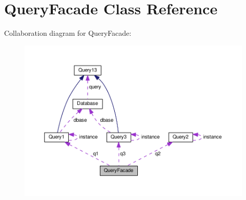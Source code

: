 \hypertarget{classQueryFacade}{}\section{Query\+Facade Class Reference}
\label{classQueryFacade}


Collaboration diagram for Query\+Facade\+:\nopagebreak
\begin{figure}[H]
\begin{center}
\leavevmode
\includegraphics[width=350pt]{classQueryFacade__coll__graph}
\end{center}
\end{figure}
